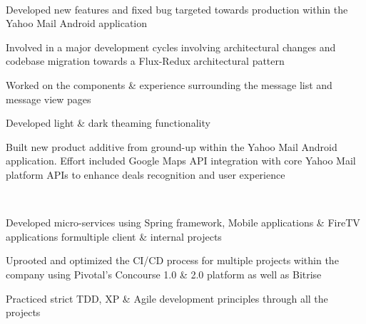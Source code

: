 \documentclass[a4paper]{MagicalCV}
\begin{document}
\begin{minipage}[t]{0.66\textwidth} 


 \\
\vspace{\topsep} %
\begin{tightemize}
\item Developed new features and fixed bug targeted towards production within the Yahoo Mail Android application 
\item Involved in a major development cycles involving architectural changes and codebase migration towards a Flux-Redux architectural pattern
\item Worked on the components \& experience surrounding the message list and message view pages
\item Developed light \& dark theaming functionality
\item Built new product additive from ground-up within the Yahoo Mail Android application. Effort included Google Maps API integration with core Yahoo Mail platform APIs to enhance deals recognition and user experience
\end{tightemize}
\sectionsep

 \\
\vspace{\topsep} %
\begin{tightemize}
\item Developed micro-services using Spring framework, Mobile applications \& FireTV applications formultiple client \& internal projects
\item Uprooted and optimized the CI/CD process for multiple projects within the company using Pivotal’s Concourse 1.0 \& 2.0 platform as well as Bitrise
\item Practiced strict TDD, XP \& Agile development principles through all the projects
\end{tightemize}
\sectionsep


\end{minipage}
\end{document}
